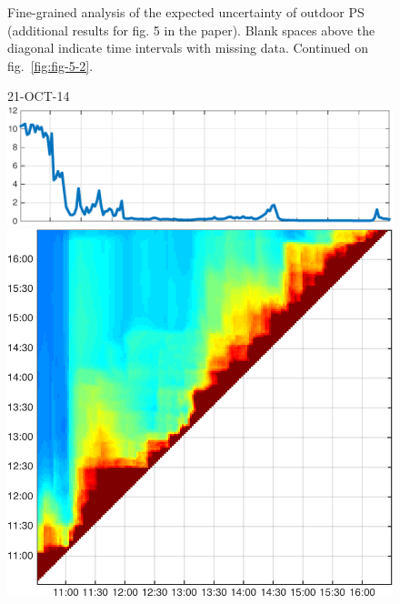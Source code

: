 \begin{figure}
\begin{minipage}[c]{\mylength}
\end{minipage}
\vspace{.5em}
\caption{Fine-grained analysis of the expected uncertainty of outdoor PS (additional results for fig. 5 in the paper). Blank spaces above the diagonal indicate time intervals with missing data. Continued on fig.~\ref{fig:fig-5-2}.}
\label{fig:fig-5-1}
\end{figure}

\begin{figure}
\centering
\begin{minipage}[c]{\mylength}
\centering \scriptsize 21-OCT-14 \\
\includegraphics[valign=t,trim=0 0 5pt 0,angle=90,origin=tr,width=\sunintwidth,totalheight=\eventheight]{events/20141021-intensity.pdf}
\includegraphics[valign=t,width=\eventswidth]{events/20141021-maxGain-local-events.png}

\end{minipage}
\end{figure}
